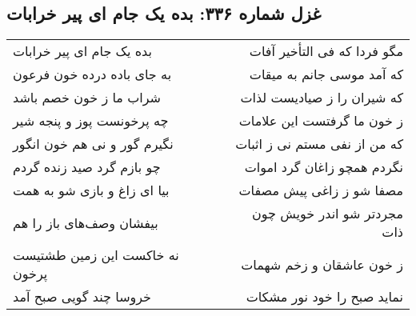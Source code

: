 \begin{center}
\section*{غزل شماره ۳۳۶: بده یک جام ای پیر خرابات}
\label{sec:0336}
\begin{longtable}{l p{0.5cm} r}
بده یک جام ای پیر خرابات
&&
مگو فردا که فی التأخیر آفات
\\
به جای باده درده خون فرعون
&&
که آمد موسی جانم به میقات
\\
شراب ما ز خون خصم باشد
&&
که شیران را ز صیادیست لذات
\\
چه پرخونست پوز و پنجه شیر
&&
ز خون ما گرفتست این علامات
\\
نگیرم گور و نی هم خون انگور
&&
که من از نفی مستم نی ز اثبات
\\
چو بازم گرد صید زنده گردم
&&
نگردم همچو زاغان گرد اموات
\\
بیا ای زاغ و بازی شو به همت
&&
مصفا شو ز زاغی پیش مصفات
\\
بیفشان وصف‌های باز را هم
&&
مجردتر شو اندر خویش چون ذات
\\
نه خاکست این زمین طشتیست پرخون
&&
ز خون عاشقان و زخم شهمات
\\
خروسا چند گویی صبح آمد
&&
نماید صبح را خود نور مشکات
\\
\end{longtable}
\end{center}
